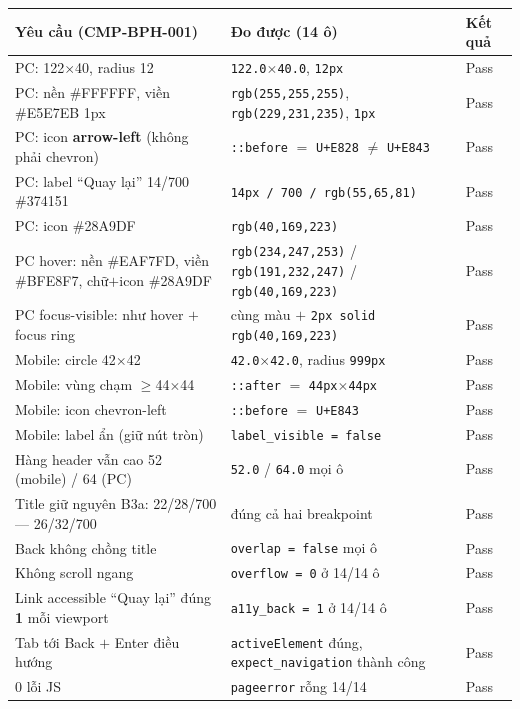 \begin{longtable}{@{}p{6.6cm}p{5.1cm}p{2.6cm}@{}}
\toprule
\textbf{Yêu cầu (CMP-BPH-001)} & \textbf{Đo được (14 ô)} & \textbf{Kết quả} \\
\midrule
\endhead
PC: 122$\times$40, radius 12 & \texttt{122.0$\times$40.0}, \texttt{12px} & Pass \\
PC: nền \#FFFFFF, viền \#E5E7EB 1px & \texttt{rgb(255,255,255)}, \texttt{rgb(229,231,235)}, \texttt{1px} & Pass \\
PC: icon \textbf{arrow-left} (không phải chevron) & \texttt{::before} $=$ \texttt{U+E828} $\ne$ \texttt{U+E843} & Pass \\
PC: label ``Quay lại'' 14/700 \#374151 & \texttt{14px / 700 / rgb(55,65,81)} & Pass \\
PC: icon \#28A9DF & \texttt{rgb(40,169,223)} & Pass \\
PC hover: nền \#EAF7FD, viền \#BFE8F7, chữ$+$icon \#28A9DF & \texttt{rgb(234,247,253)} / \texttt{rgb(191,232,247)} / \texttt{rgb(40,169,223)} & Pass \\
PC focus-visible: như hover $+$ focus ring & cùng màu $+$ \texttt{2px solid rgb(40,169,223)} & Pass \\
Mobile: circle 42$\times$42 & \texttt{42.0$\times$42.0}, radius \texttt{999px} & Pass \\
Mobile: vùng chạm $\geq$44$\times$44 & \texttt{::after} $=$ \texttt{44px$\times$44px} & Pass \\
Mobile: icon chevron-left & \texttt{::before} $=$ \texttt{U+E843} & Pass \\
Mobile: label ẩn (giữ nút tròn) & \texttt{label\_visible = false} & Pass \\
Hàng header vẫn cao 52 (mobile) / 64 (PC) & \texttt{52.0} / \texttt{64.0} mọi ô & Pass \\
Title giữ nguyên B3a: 22/28/700 --- 26/32/700 & đúng cả hai breakpoint & Pass \\
Back không chồng title & \texttt{overlap = false} mọi ô & Pass \\
Không scroll ngang & \texttt{overflow = 0} ở 14/14 ô & Pass \\
Link accessible ``Quay lại'' đúng \textbf{1} mỗi viewport & \texttt{a11y\_back = 1} ở 14/14 ô & Pass \\
Tab tới Back $+$ Enter điều hướng & \texttt{activeElement} đúng, \texttt{expect\_navigation} thành công & Pass \\
0 lỗi JS & \texttt{pageerror} rỗng 14/14 & Pass \\
\bottomrule
\end{longtable}

